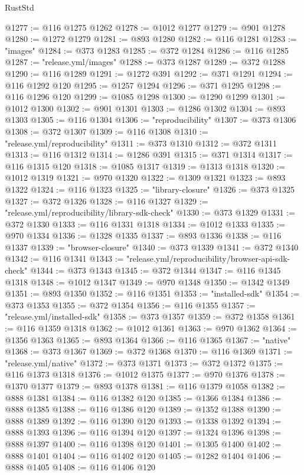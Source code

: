 \begin{lexlean}{RustStd}
\begin{coremodule}
@1277 := @116 @1275 @1262
@1278 := @1012 @1277
@1279 := @901 @1278
@1280 := @1272 @1279
@1281 := @893 @1280
@1282 := @116 @1281
@1283 := "images"
@1284 := @373 @1283
@1285 := @372 @1284
@1286 := @116 @1285
@1287 := "release.yml/images"
@1288 := @373 @1287
@1289 := @372 @1288
@1290 := @116 @1289
@1291 := @1272 @391
@1292 := @371 @1291
@1294 := @116 @1292 @120
@1295 := @1257 @1294
@1296 := @371 @1295
@1298 := @116 @1296 @120
@1299 := @1085 @1298
@1300 := @1290 @1299
@1301 := @1012 @1300
@1302 := @901 @1301
@1303 := @1286 @1302
@1304 := @893 @1303
@1305 := @116 @1304
@1306 := "reproducibility"
@1307 := @373 @1306
@1308 := @372 @1307
@1309 := @116 @1308
@1310 := "release.yml/reproducibility"
@1311 := @373 @1310
@1312 := @372 @1311
@1313 := @116 @1312
@1314 := @1286 @391
@1315 := @371 @1314
@1317 := @116 @1315 @120
@1318 := @1085 @1317
@1319 := @1313 @1318
@1320 := @1012 @1319
@1321 := @970 @1320
@1322 := @1309 @1321
@1323 := @893 @1322
@1324 := @116 @1323
@1325 := "library-closure"
@1326 := @373 @1325
@1327 := @372 @1326
@1328 := @116 @1327
@1329 := "release.yml/reproducibility/library-sdk-check"
@1330 := @373 @1329
@1331 := @372 @1330
@1333 := @116 @1331 @1318
@1334 := @1012 @1333
@1335 := @970 @1334
@1336 := @1328 @1335
@1337 := @893 @1336
@1338 := @116 @1337
@1339 := "browser-closure"
@1340 := @373 @1339
@1341 := @372 @1340
@1342 := @116 @1341
@1343 := "release.yml/reproducibility/browser-api-sdk-check"
@1344 := @373 @1343
@1345 := @372 @1344
@1347 := @116 @1345 @1318
@1348 := @1012 @1347
@1349 := @970 @1348
@1350 := @1342 @1349
@1351 := @893 @1350
@1352 := @116 @1351
@1353 := "installed-sdk"
@1354 := @373 @1353
@1355 := @372 @1354
@1356 := @116 @1355
@1357 := "release.yml/installed-sdk"
@1358 := @373 @1357
@1359 := @372 @1358
@1361 := @116 @1359 @1318
@1362 := @1012 @1361
@1363 := @970 @1362
@1364 := @1356 @1363
@1365 := @893 @1364
@1366 := @116 @1365
@1367 := "native"
@1368 := @373 @1367
@1369 := @372 @1368
@1370 := @116 @1369
@1371 := "release.yml/native"
@1372 := @373 @1371
@1373 := @372 @1372
@1375 := @116 @1373 @1318
@1376 := @1012 @1375
@1377 := @970 @1376
@1378 := @1370 @1377
@1379 := @893 @1378
@1381 := @116 @1379 @1058
@1382 := @888 @1381
@1384 := @116 @1382 @120
@1385 := @1366 @1384
@1386 := @888 @1385
@1388 := @116 @1386 @120
@1389 := @1352 @1388
@1390 := @888 @1389
@1392 := @116 @1390 @120
@1393 := @1338 @1392
@1394 := @888 @1393
@1396 := @116 @1394 @120
@1397 := @1324 @1396
@1398 := @888 @1397
@1400 := @116 @1398 @120
@1401 := @1305 @1400
@1402 := @888 @1401
@1404 := @116 @1402 @120
@1405 := @1282 @1404
@1406 := @888 @1405
@1408 := @116 @1406 @120

\end{coremodule}
\end{lexlean}
